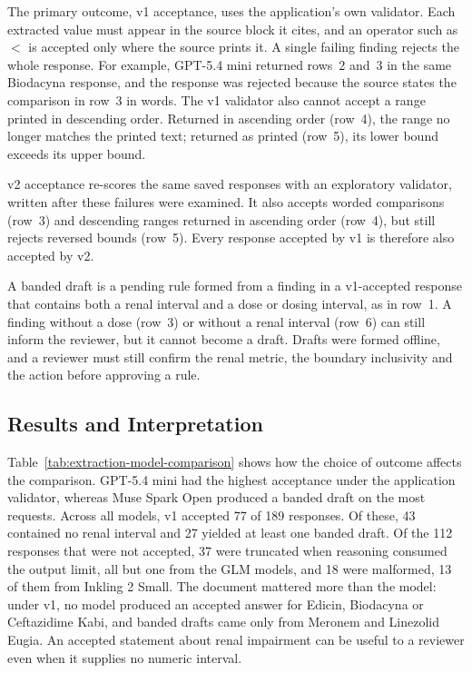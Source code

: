 \documentclass[12pt,a4paper,twoside]{book}
\begin{document}
The primary outcome, v1 acceptance, uses the application's own validator.
Each extracted value must appear in the source block it cites, and an operator such as \(<\) is accepted only where the source prints it.
A single failing finding rejects the whole response.
For example, GPT-5.4 mini returned rows~2 and~3 in the same Biodacyna response, and the response was rejected because the source states the comparison in row~3 in words.
The v1 validator also cannot accept a range printed in descending order.
Returned in ascending order (row~4), the range no longer matches the printed text; returned as printed (row~5), its lower bound exceeds its upper bound.

v2 acceptance re-scores the same saved responses with an exploratory validator, written after these failures were examined.
It also accepts worded comparisons (row~3) and descending ranges returned in ascending order (row~4), but still rejects reversed bounds (row~5).
Every response accepted by v1 is therefore also accepted by v2.

A banded draft is a pending rule formed from a finding in a v1-accepted response that contains both a renal interval and a dose or dosing interval, as in row~1.
A finding without a dose (row~3) or without a renal interval (row~6) can still inform the reviewer, but it cannot become a draft.
Drafts were formed offline, and a reviewer must still confirm the renal metric, the boundary inclusivity and the action before approving a rule.

\subsection{Results and Interpretation}
\label{ssec:extraction-results}

Table~\ref{tab:extraction-model-comparison} shows how the choice of outcome affects the comparison.
GPT-5.4 mini had the highest acceptance under the application validator, whereas Muse Spark Open produced a banded draft on the most requests.
Across all models, v1 accepted 77 of 189 responses. Of these, 43 contained no renal interval and 27 yielded at least one banded draft.
Of the 112 responses that were not accepted, 37 were truncated when reasoning consumed the output limit, all but one from the GLM models, and 18 were malformed, 13 of them from Inkling 2 Small.
The document mattered more than the model: under v1, no model produced an accepted answer for Edicin, Biodacyna or Ceftazidime Kabi, and banded drafts came only from Meronem and Linezolid Eugia.
An accepted statement about renal impairment can be useful to a reviewer even when it supplies no numeric interval.
\end{document}
